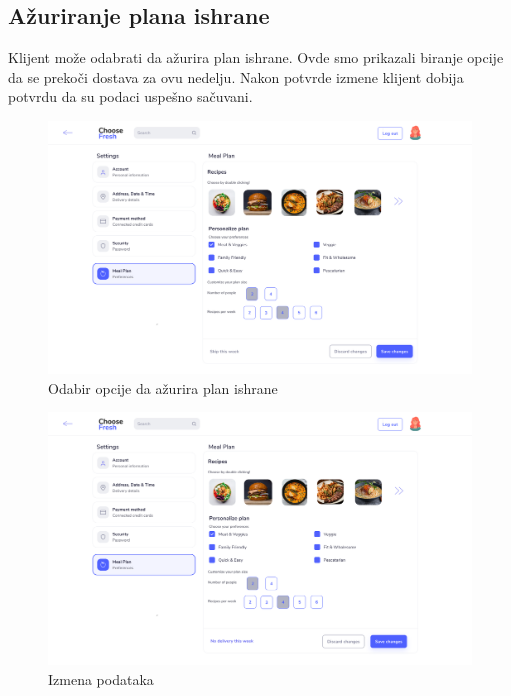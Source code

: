 \subsection{Ažuriranje plana ishrane}

Klijent može odabrati da ažurira plan ishrane. Ovde smo prikazali biranje opcije da se prekoči dostava za ovu nedelju. Nakon potvrde izmene klijent dobija potvrdu da su podaci uspešno sačuvani.

\begin{figure}[H]
	\begin{center}
		\includegraphics[width=\textwidth]{UI/meal_plan.png}
    		\caption{Odabir opcije da ažurira plan ishrane}
    \label{fig:MealPlan}
    \end{center}
\end{figure}

\begin{figure}[H]
	\begin{center}
		\includegraphics[width=\textwidth]{UI/meal_plan_update.png}
    		\caption{Izmena podataka}
    \label{fig:MealPlanUpdate}
    \end{center}
\end{figure}

